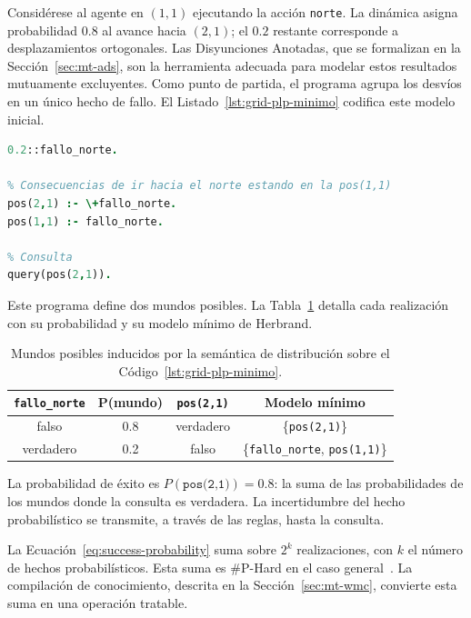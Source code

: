 Considérese al agente en $(1,1)$ ejecutando la acción \texttt{norte}. La dinámica asigna probabilidad $0.8$ al avance hacia $(2,1)$; el $0.2$ restante corresponde a desplazamientos ortogonales. Las Disyunciones Anotadas, que se formalizan en la Sección~\ref{sec:mt-ads}, son la herramienta adecuada para modelar estos resultados mutuamente excluyentes. Como punto de partida, el programa agrupa los desvíos en un único hecho de fallo. El Listado~\ref{lst:grid-plp-minimo} codifica este modelo inicial.

\begin{lstlisting}[caption={Programa probabilístico. Se agrupan los desvíos en un único fallo.}, label={lst:grid-plp-minimo}, language=Prolog]
% Probabilidad agrupada de cualquier desvio ortogonal
0.2::fallo_norte.

% Consecuencias de ir hacia el norte estando en la pos(1,1)
pos(2,1) :- \+fallo_norte.
pos(1,1) :- fallo_norte.

% Consulta
query(pos(2,1)).
\end{lstlisting}

Este programa define dos mundos posibles. La Tabla~\ref{tab:mundos_posibles_problog} detalla cada realización con su probabilidad y su modelo mínimo de Herbrand.

\begin{table}[H]
\centering
\caption{Mundos posibles inducidos por la semántica de distribución sobre el Código~\ref{lst:grid-plp-minimo}.}
\label{tab:mundos_posibles_problog}
\small
\begin{tabular}{cccc}
\toprule
\texttt{fallo\_norte} & P(mundo) & \texttt{pos(2,1)} & Modelo mínimo \\
\midrule
falso  & 0.8 & verdadero & \{\texttt{pos(2,1)}\} \\
verdadero & 0.2 & falso     & \{\texttt{fallo\_norte}, \texttt{pos(1,1)}\} \\
\bottomrule
\end{tabular}
\end{table}

La probabilidad de éxito es $P(\texttt{pos(2,1)}) = 0.8$: la suma de las probabilidades de los mundos donde la consulta es verdadera. La incertidumbre del hecho probabilístico se transmite, a través de las reglas, hasta la consulta.

La Ecuación~\ref{eq:success-probability} suma sobre $2^k$ realizaciones, con $k$ el número de hechos probabilísticos. Esta suma es \#P-Hard en el caso general~\cite{fierens2015inference}. La compilación de conocimiento, descrita en la Sección~\ref{sec:mt-wmc}, convierte esta suma en una operación tratable.

